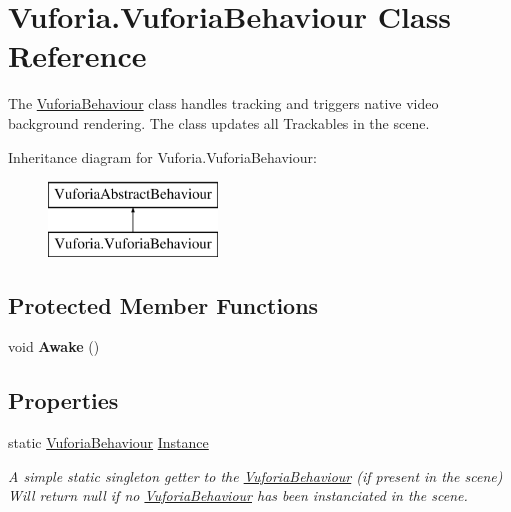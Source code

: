 \hypertarget{class_vuforia_1_1_vuforia_behaviour}{}\section{Vuforia.\+Vuforia\+Behaviour Class Reference}
\label{class_vuforia_1_1_vuforia_behaviour}


The \hyperlink{class_vuforia_1_1_vuforia_behaviour}{Vuforia\+Behaviour} class handles tracking and triggers native video background rendering. The class updates all Trackables in the scene.  


Inheritance diagram for Vuforia.\+Vuforia\+Behaviour\+:\begin{figure}[H]
\begin{center}
\leavevmode
\includegraphics[height=2.000000cm]{class_vuforia_1_1_vuforia_behaviour}
\end{center}
\end{figure}
\subsection*{Protected Member Functions}
\begin{DoxyCompactItemize}
\item 
\hypertarget{class_vuforia_1_1_vuforia_behaviour_a3beb57ed3d30146f27f3b98552b66020}{}void {\bfseries Awake} ()\label{class_vuforia_1_1_vuforia_behaviour_a3beb57ed3d30146f27f3b98552b66020}

\end{DoxyCompactItemize}
\subsection*{Properties}
\begin{DoxyCompactItemize}
\item 
static \hyperlink{class_vuforia_1_1_vuforia_behaviour}{Vuforia\+Behaviour} \hyperlink{class_vuforia_1_1_vuforia_behaviour_abc8283fe39991709ed508253e995f9a1_abc8283fe39991709ed508253e995f9a1}{Instance}
\begin{DoxyCompactList}\small\item\em A simple static singleton getter to the \hyperlink{class_vuforia_1_1_vuforia_behaviour}{Vuforia\+Behaviour} (if present in the scene) Will return null if no \hyperlink{class_vuforia_1_1_vuforia_behaviour}{Vuforia\+Behaviour} has been instanciated in the scene. \end{DoxyCompactList}\end{DoxyCompactItemize}


